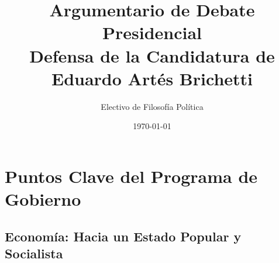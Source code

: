 \documentclass[a4paper, 11pt]{article}
\title{
    \Huge \textbf{Argumentario de Debate Presidencial} \\
    \large \vspace{0.5cm} Defensa de la Candidatura de Eduardo Artés Brichetti
}
\author{Electivo de Filosofía Política}
\date{\today}
\begin{document}
\maketitle
\thispagestyle{empty} %
\tableofcontents %
\newpage

\section{Puntos Clave del Programa de Gobierno}

\subsection{Economía: Hacia un Estado Popular y Socialista}
\end{document}
